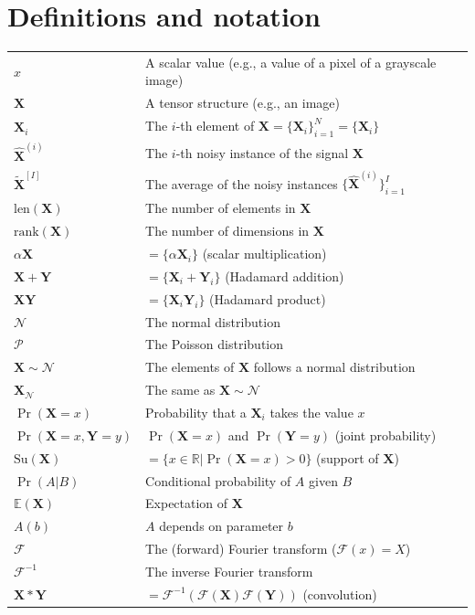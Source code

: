 \documentclass{article}
\begin{document}
\section*{Definitions and notation}
\begin{tabular}{ll}
  $x$ & A scalar value (e.g., a value of a pixel of a grayscale image) \\
  $\mathbf{X}$ & A tensor structure (e.g., an image) \\
  $\mathbf{X}_i$ & The $i$-th element of $\mathbf{X}=\{\mathbf{X}_i\}_{i=1}^N=\{\mathbf{X}_i\}$ \\
  $\hat{\mathbf{X}}^{(i)}$ & The $i$-th noisy instance of the signal $\mathbf{X}$ \\
  $\tilde{\mathbf{X}}^{[I]}$ & The average of the noisy instances $\{\hat{\mathbf{X}}^{(i)}\}_{i=1}^I$ \\ 
  $\text{len}(\mathbf{X})$ & The number of elements in $\mathbf{X}$ \\
  $\text{rank}(\mathbf{X})$ & The number of dimensions in $\mathbf{X}$ \\
  $\alpha\mathbf{X}$ & $=\{\alpha\mathbf{X}_i\}$ (scalar multiplication) \\
  $\mathbf{X}+\mathbf{Y}$ & $=\{\mathbf{X}_i + \mathbf{Y}_i\}$ (Hadamard addition) \\ 
  $\mathbf{X}\mathbf{Y}$ & $=\{\mathbf{X}_i\mathbf{Y}_i\}$ (Hadamard product) \\ 
  $\mathcal{N}$ & The normal distribution \\ 
  $\mathcal{P}$ & The Poisson distribution \\
  $\mathbf{X}\sim\mathcal{N}$ & The elements of $\mathbf{X}$ follows a normal distribution \\
  $\mathbf{X}_{\mathcal{N}}$ & The same as $\mathbf{X}\sim\mathcal{N}$ \\
  $\Pr(\mathbf{X}=x)$ & Probability that a $\mathbf{X}_i$ takes the value $x$ \\
  $\Pr(\mathbf{X}=x, \mathbf{Y}=y)$ & $\Pr(\mathbf{X}=x)$ and $\Pr(\mathbf{Y}=y)$ (joint probability)  \\
  $\mathrm{Su}(\mathbf{X})$ & $=\{x\in\mathbb{R}|\Pr(\mathbf{X}=x)>0\}$ (support of $\mathbf{X}$)\\
  $\Pr(A|B)$ & Conditional probability of $A$ given $B$ \\
  $\mathbb{E}(\mathbf{X})$ & Expectation of $\mathbf{X}$ \\ 
  $A(b)$ & $A$ depends on parameter $b$ \\
  $\mathcal{F}$ & The (forward) Fourier transform ($\mathcal{F}(x)=X$) \\
  $\mathcal{F}^{-1}$ & The inverse Fourier transform \\
  $\mathbf{X}*\mathbf{Y}$ & $=\mathcal{F}^{-1}(\mathcal{F}(\mathbf{X})\mathcal{F}(\mathbf{Y}))$ (convolution)
\end{tabular}
\end{document}
